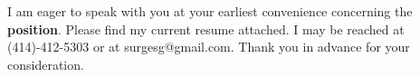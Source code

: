 \documentclass[10pt,stdletter,dateno,sigleft]{newlfm} %
\begin{document}
\begin{newlfm}
    I am eager to speak with you at your earliest convenience concerning the
    {\bf position}. Please find my current resume attached. 
    I may be reached at (414)-412-5303 or at surgesg@gmail.com.
    Thank you in advance for your consideration.


\end{newlfm}
\end{document}
